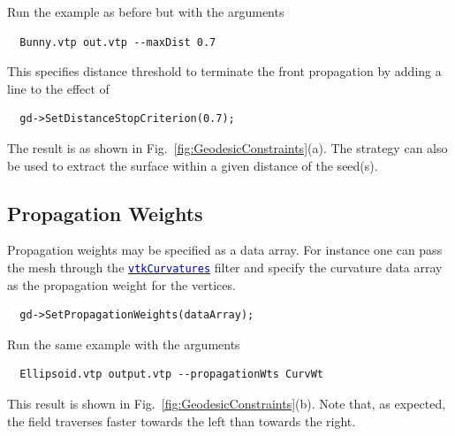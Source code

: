\documentclass{InsightArticle}
\def\vtk#1{\href{www.vtk.org/doc/nightly/html/class#1.html}{\small\textcolor{darkblue}{\texttt{#1}}}}
\begin{document}
Run the example as before but with the arguments
\begin{lstlisting}
  Bunny.vtp out.vtp --maxDist 0.7
\end{lstlisting}
This specifies distance threshold to terminate the front propagation by adding a line to the effect of
\begin{lstlisting}
  gd->SetDistanceStopCriterion(0.7);
\end{lstlisting}

The result is as shown in Fig.~\ref{fig:GeodesicConstraints}(a). The strategy can also be used to extract the surface within a given distance of the seed(s).

\subsection{Propagation Weights}
Propagation weights may be specified as a data array. For instance one can pass the mesh through the \vtk{vtkCurvatures} filter and specify the curvature data array as the propagation weight for the vertices.
\begin{lstlisting}
  gd->SetPropagationWeights(dataArray);
\end{lstlisting}
Run the same example with the arguments
\begin{lstlisting}
  Ellipsoid.vtp output.vtp --propagationWts CurvWt
\end{lstlisting}
This result is shown in Fig.~\ref{fig:GeodesicConstraints}(b).
Note that, as expected, the field traverses faster towards the left than towards the right.
\end{document}

